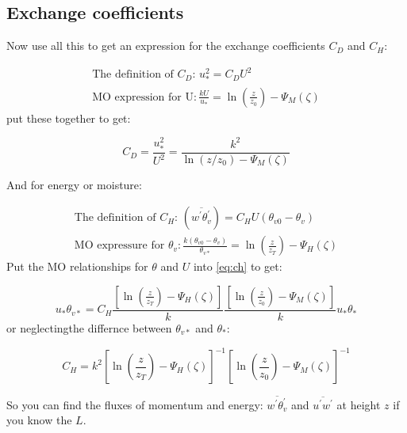 \documentclass[11pt]{article}
\begin{document}
\subsection{Exchange coefficients}
\label{sec:exch-coeff}

Now use all this to get an expression for the exchange coefficients $C_D$ and
$C_H$:

\begin{gather}
\text{The definition of $C_D$: } u_*^2 = C_D U^2\\
\text{MO expression for U}: \frac{ k U}{u_*} = \ln \left ( \frac{ z}{z_0} \right ) - \Psi_M(\zeta)
\end{gather}
put these together to get:

\begin{equation}
  \label{eq:drag}
  C_D = \frac{ u_*^2}{U^2} = \frac{ k^2}{ \ln(z/z_0) - \Psi_M(\zeta)} 
\end{equation}


And for energy or moisture:

\begin{gather}
\text{The definition of $C_H$: } \left (\overline{ w^\prime \theta_v^\prime } \right )  = 
         C_H U (\theta_{v0} - \theta_v) \label{eq:ch}\\
\text{MO expressure for $\theta_v$}: \frac{k(\theta_{v0} - \theta_v)}{\theta_{v*}} = 
\ln \left ( \frac{ z}{z_T} \right ) - \Psi_H(\zeta)
\end{gather}
Put the MO relationships for $\theta$ and $U$ into \eqref{eq:ch} to get:

\begin{equation}
  \label{eq:chfinal}
u_* \theta_{v*} = C_H   \frac{\left [\ln \left ( \frac{ z}{z_T} \right ) - \Psi_H(\zeta)\right ] }{k} 
\frac{ \left [  \ln \left ( \frac{ z}{z_0} \right ) - \Psi_M(\zeta)\right ] }{k} u_* \theta_* 
\end{equation}
or neglectingthe differnce between $\theta_{v*}$ and $ \theta_* $:

\begin{equation}
  \label{eq:chfinal}
 C_H = k^2   \left [\ln \left ( \frac{ z}{z_T} \right ) - \Psi_H(\zeta)\right ]^{-1} 
\left [  \ln \left ( \frac{ z}{z_0} \right ) - \Psi_M(\zeta)\right ]^{-1} 
\end{equation}

So you can find the fluxes of momentum and energy: $\overline{ w^\prime \theta_v^\prime }$
and $\overline{u^\prime w^\prime}$ at height $z$ if you know
the $L$.
\end{document}

